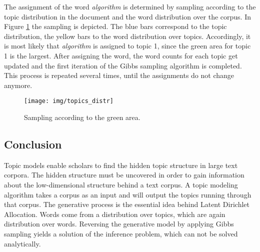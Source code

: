 \documentclass[a4paper,ngerman, english]{atseminar}
\begin{document}
\begin{example}
The assignment of the word \textit{algorithm} is determined by sampling according
to the topic distribution in the document and the word distribution over the corpus.
In Figure \ref{fig:topics_distr} the sampling is depicted. The blue bars correspond to 
the topic distribution, the yellow bars to the word distribution over topics.
Accordingly, it is most likely that \textit{algorithm} is assigned to topic 1, since the green 
area for topic 1 is the largest.
After assigning the word, the word counts for each topic get updated and 
the first iteration of the Gibbs sampling algorithm is completed. This process is 
repeated several times, until the assignments do not change anymore. 


\begin{figure}[H]
\centering
\texttt{[image: img/topics\_distr]}
 \caption{Sampling according to the green area.}
  \label{fig:topics_distr}
\end{figure}


\end{example}





\subsection{Conclusion}

Topic models enable scholars to find the hidden topic structure in large text 
corpora. The hidden structure must be uncovered in order to gain information 
about the low-dimensional structure behind a text corpus.
A topic modeling algorithm takes a corpus as an input and will output the topics
running through that corpus.
The generative process is the essential idea behind Latent Dirichlet Allocation.
Words come from a distribution over topics, which are again distribution over words.
Reversing the generative model by applying Gibbs sampling yields a solution of 
the inference problem, which can not be solved analytically. 


\clearpage













\end{document}
